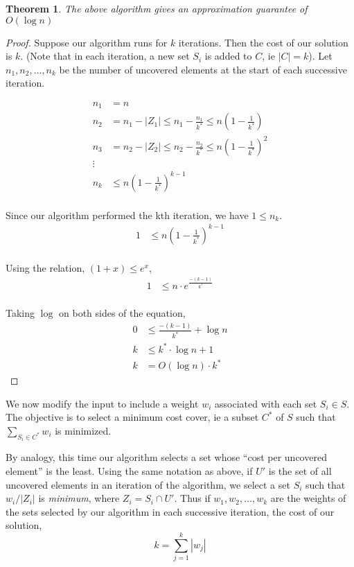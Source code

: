 \documentclass[10pt]{article}
\newtheorem{theorem}{Theorem}[section]
\begin{document}
\begin{theorem}
The above algorithm gives an approximation guarantee of $O(\log{n})$
\end{theorem}
\begin{proof}
Suppose our algorithm runs for $k$ iterations. Then the cost of our solution is $k$. (Note that in each iteration, a new set $S_i$ is added to $C$, ie $|C| = k$). Let $n_1, n_2, \ldots , n_k$ be the number of uncovered elements at the start of each successive iteration.

\begin{align*}
n_1 & = n \\
n_2 & = n_1 - |Z_1| \leq n_1 - \frac{n_1}{k^*} \leq n(1 - \frac{1}{k^*}) \\
n_3 & = n_2 - |Z_2| \leq n_2 - \frac{n_2}{k^*} \leq n(1 - \frac{1}{k^*})^2 \\
\vdots & \\
n_k & \leq n(1 - \frac{1}{k^*})^{k-1} \\
\end{align*}

Since our algorithm performed the kth iteration, we have $1 \leq n_k$.
\begin{align*}
1 & \leq n(1 - \frac{1}{k^*})^{k-1} \\
\end{align*}

Using the relation, $(1 + x) \leq e^x$,
\begin{align*}
1 & \leq n \cdot e^{\frac{-(k-1)}{k^*}} \\
\end{align*}

Taking $\log$ on both sides of the equation,
\begin{align*}
0 & \leq \frac{-(k-1)}{k^*} + \log{n} \\
k & \leq k^* \cdot \log{n} + 1 \\
k & = O(\log{n}) \cdot k^*
\end{align*}
\end{proof}
\bigskip

We now modify the input to include a weight $w_i$ associated with each set $S_i \in S$. The objective is to select a minimum cost cover, ie a subset $C^*$ of $S$ such that $\displaystyle \sum_{S_i \in C^*} w_i$ is minimized.

By analogy, this time our algorithm selects a set whose ``cost per uncovered element'' is the least. Using the same notation as above, if $U'$ is the set of all uncovered elements in an iteration of the algorithm, we select a set $S_i$ such that $w_i / |Z_i|$ is \emph{minimum}, where $Z_i = S_i \cap U'$. Thus if $w_1, w_2, \ldots, w_k$ are the weights of the sets selected by our algorithm in each successive iteration, the cost of our solution, 
\[
k = \sum_{j = 1}^{k} |w_j|
\]
\end{document}

